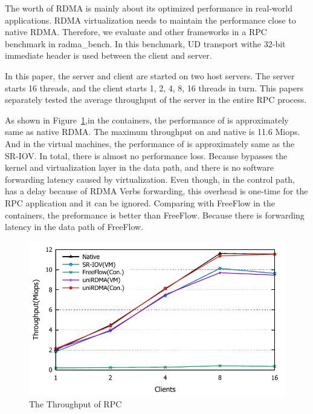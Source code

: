 The worth of RDMA is mainly about its optimized performance in real-world applications. RDMA virtualization needs to maintain the performance close to native RDMA. Therefore, we evaluate \sys and other frameworks in a RPC benchmark in radma\_bench\cite{rbench}. In this benchmark, UD transport withe 32-bit immediate header is used between the client and server.

In this paper, the server and client are started on two host servers. The server starts 16 threads, and the client starts 1, 2, 4, 8, 16 threads in turn. This papers separately tested the average throughput of the server in the entire RPC process.

As shown in Figure~\ref{fig:rpc},in the containers, the performance of \sys is approximately same as native RDMA. The
maximum throughput on \sys and native is 11.6 Miops. And in the virtual machines, the performance of \sys is approximately same as the SR-IOV. In total, there is almost no performance loss. Because \sys bypasses the kernel and virtualization layer in the data path, and there is no software forwarding latency caused by virtualization. Even though, in the control path, \sys has a delay because of RDMA Verbs forwarding, this overhead is one-time for the RPC application and it can be ignored. Comparing with FreeFlow in the containers, the preformance \sys is better than FreeFlow. Because there is forwarding latency in the data path of FreeFlow.

\begin{figure}[!ht]
	\centering
	\includegraphics[width=1.0\linewidth]{images/rpc.pdf}
	\caption{The Throughput of RPC}
	\label{fig:rpc}
\end{figure}